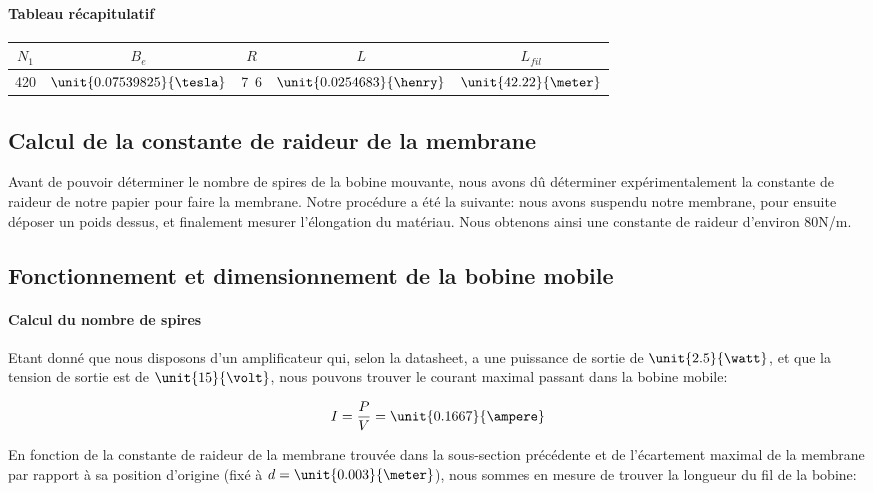 \paragraph{Tableau récapitulatif}

\begin{center}
	\begin{tabular}{c|c|c|c|c}
		$N_1$ & $B_e$ & $R$ & $L$ & $L_{fil}$ \\
		\hline
		420 & $\unit{0.07539825}{\tesla}$ & \unit{7.6}{\ohm} & $\unit{0.0254683}{\henry}$ & $\unit{42.22}{\meter}$\\
	\end{tabular}
\end{center}


\subsection{Calcul de la constante de raideur de la membrane}
Avant de pouvoir déterminer le nombre de spires de la bobine mouvante, nous avons dû déterminer
expérimentalement la constante de raideur de notre papier pour faire la membrane.
Notre procédure a été la suivante: nous avons suspendu notre membrane, pour ensuite 
déposer un poids dessus, et finalement mesurer l'élongation du matériau.
Nous obtenons ainsi une constante de raideur d'environ \unit {80}{N/m}.

\subsection{Fonctionnement et dimensionnement de la bobine mobile}

\paragraph{Calcul du nombre de spires}
Etant donné que nous disposons d'un amplificateur qui, selon la datasheet, a une puissance de sortie de 
$\unit{2.5}{\watt}$, et que la tension de sortie est de $\unit{15}{\volt}$, nous pouvons trouver le courant
maximal passant dans la bobine mobile:

$$I = \frac{P}{V} = \unit{0.1667}{\ampere}$$

En fonction de la constante de raideur de la membrane trouvée dans la sous-section précédente et de l'écartement
maximal de la membrane par rapport à sa position d'origine (fixé à $d = \unit{0.003}{\meter}$), nous sommes en
mesure de trouver la longueur du fil de la bobine:

